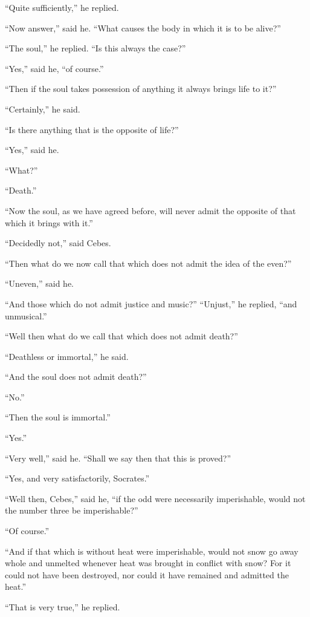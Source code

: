\documentclass[letterpaper,12pt]{article}
\newcommand{\stephpag}[1]{\marginnote{\small\itshape\fontfamily{ppl}\selectfont #1}}
\begin{document}
\begin{drama}
``Quite sufficiently,'' he replied.
 
``Now answer,'' said he. ``What causes the body in which it is to be alive?''
 
``The soul,'' he replied. \stephpag{d} ``Is this always the case?''
 
``Yes,'' said he, ``of course.''
 
``Then if the soul takes possession of anything it always brings life to it?''
 
``Certainly,'' he said.
 
``Is there anything that is the opposite of life?''
 
``Yes,'' said he.
 
``What?''
 
``Death.''
 
``Now the soul, as we have agreed before, will never admit the opposite of that which it brings with it.''
 
``Decidedly not,'' said Cebes.
 
``Then what do we now call that which does not admit the idea of the even?''
 
``Uneven,'' said he.
 
``And those which do not admit justice and music?'' \stephpag{e} ``Unjust,'' he replied, ``and unmusical.''
 
``Well then what do we call that which does not admit death?''
 
``Deathless or immortal,'' he said.
 
``And the soul does not admit death?''
 
``No.''
 
``Then the soul is immortal.''
 
``Yes.''
 
``Very well,'' said he. ``Shall we say then that this is proved?''
 
``Yes, and very satisfactorily, Socrates.''
 
``Well then, Cebes,'' said he, ``if the odd were necessarily imperishable, \stephpag{106 a} would not the number three be imperishable?''
 
``Of course.''
 
``And if that which is without heat were imperishable, would not snow go away whole and unmelted whenever heat was brought in conflict with snow? For it could not have been destroyed, nor could it have remained and admitted the heat.''
 
``That is very true,'' he replied.
 

\end{drama}
\end{document}

